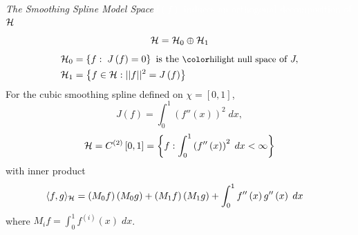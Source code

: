 \begin{frame}{\textit{The Smoothing Spline Model Space}}{\textcolor{white}{$J\left(f\right)$ induces an orthogonal decomposition of $\mathcal{H}$:}}
\footnotesize
\[
\mathcal{H} = \mathcal{H}_0 \oplus \mathcal{H}_1
\]
\begin{align*}
\mathcal{H}_0 &= \left\{ f:\; J\left(f\right) = 0\right\} \mbox{ is the \nt{null space} of } J, \\
\hilbert_1 &= \left\{ f \in \hilbert:  \vert \vert f \vert \vert^2 =  J\left(f\right) \right\}
\end{align*}
\footnotesize
For the cubic smoothing spline defined on $\chi = \left[0,1\right]$, 
\begin{equation*} %
J\left(f\right) = \int_0^1  \left(f''\left(x\right)\right)^2\;dx,
\end{equation*}
\begin{equation*}
\mathcal{H} = C^{\left(2\right)}\left[0,1\right] = \left\{f: \int_{0}^1 \left(f''\left(x\right)\right)^2\;dx < \infty \right\}
\end{equation*}
with inner product
\begin{align*} 
\langle f,g \rangle_\hilbert &= \left(M_{0} f \right)\left(M_{0} g\right) + \left(M_{1} f\right) \left(M_{1} g\right) + \int_0^1 f''\left(x\right)g''\left(x\right)\;dx%
\end{align*}
where $M_i f = \int_0^1 f^{\left( i \right)}\left(x\right)\;dx$.

\end{frame}

